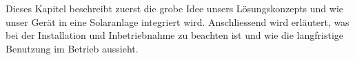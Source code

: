 Dieses Kapitel beschreibt  zuerst die grobe Idee  unsers L\"osungskonzepts und
wie  unser Ger\"at  in  eine Solaranlage  integriert wird. Anschliessend  wird
erl\"autert, was bei  der Installation und Inbetriebnahme zu  beachten ist und
wie die langfristige Benutzung im Betrieb aussieht.

